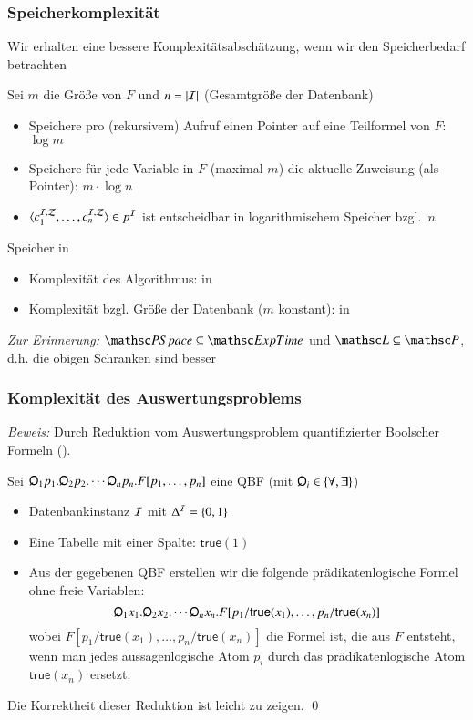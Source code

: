 \documentclass[aspectratio=1610,onlymath]{beamer}
\begin{document}
\begin{frame}\frametitle{Speicherkomplexität}

Wir erhalten eine bessere Komplexitätsabschätzung, wenn wir den Speicherbedarf
betrachten
\bigskip

Sei $m$ die Größe von $F$ und $n=|\mathcal{I}|$ (Gesamtgröße der Datenbank)
\bigskip

\begin{itemize}
\item Speichere pro (rekursivem) Aufruf einen Pointer auf eine Teilformel von $F$: $\log m$
\item Speichere für jede Variable in $F$ (maximal $m$) die aktuelle Zuweisung (als Pointer): $m\cdot\log n$
\item $\langle{c_1^{\mathcal{I},\mathcal{Z}},\ldots,c_n^{\mathcal{I},\mathcal{Z}}}\rangle\in p^{\mathcal{I}}$ ist entscheidbar in logarithmischem Speicher bzgl.\ $n$
\end{itemize}
\bigskip\pause

Speicher in 
\begin{itemize}
\item Komplexität des Algorithmus: \alert{in \PSpace}
\item Komplexität bzgl. Größe der Datenbank ($m$ konstant): \alert{in \LogSpace}
\end{itemize}

{\tiny\emph{Zur Erinnerung:} $\PSpace\subseteq\ExpTime$ und $\LogSpace\subseteq\PTime$, d.h. die obigen Schranken sind besser}

\end{frame}

\begin{frame}\frametitle{Komplexität des Auswertungsproblems}

\pause

\emph{Beweis:} Durch Reduktion vom Auswertungsproblem quantifizierter Boolscher Formeln ().\medskip

Sei $\quantor_1 p_1. \quantor_2 p_2. \cdots \quantor_n p_n.F[p_1,\ldots,p_n]$ eine QBF (mit $\quantor_i\in\{\forall,\exists\}$)\pause
\begin{itemize}
\item Datenbankinstanz $\mathcal{I}$ mit $\Delta^{\mathcal{I}}=\{0,1\}$
\item Eine Tabelle mit einer Spalte: $\textsf{true}(1)$
\item Aus der gegebenen QBF erstellen wir die folgende prädikatenlogische Formel ohne freie Variablen:
\[\quantor_1 x_1. \quantor_2 x_2. \cdots \quantor_n x_n.F[p_1/\textsf{true}(x_1),\ldots,p_n/\textsf{true}(x_n)]\]
wobei $F[p_1/\textsf{true}(x_1),\ldots,p_n/\textsf{true}(x_n)]$ die Formel ist, die aus $F$ entsteht, wenn man jedes aussagenlogische Atom $p_i$ durch das prädikatenlogische Atom
$\textsf{true}(x_n)$ ersetzt.
\end{itemize}
Die Korrektheit dieser Reduktion ist leicht zu zeigen. \qed

\end{frame}
\end{document}
